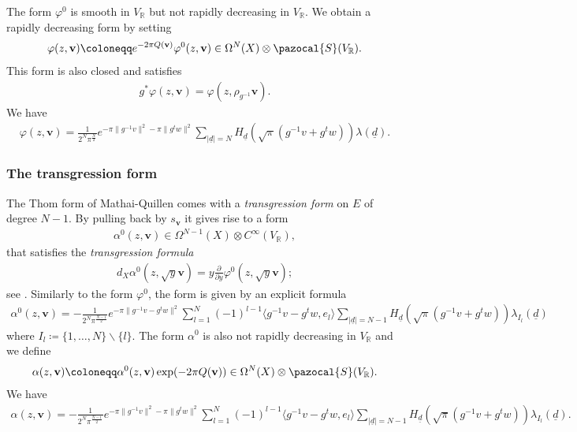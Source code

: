 \documentclass[twoside,a4paper,10pt]{article} %
\newcommand{\uud}{\underline{d}}
\newcommand{\8}{\infty}
\newcommand{\vbf}{\mathbf{v}}
\newcommand{\R}{\mathbb{R}}
\newcommand{\Scal}{\pazocal{S}}
\theoremstyle{mytheoremstyle}
\theoremstyle{remark}
\numberwithin{equation}{section}
\begin{document}
The form $\varphi^0$ is smooth in $V_\R$ but not rapidly decreasing in $V_\R$. We obtain a rapidly decreasing form by setting
\begin{align}
\varphi(z,\vbf) \coloneqq e^{-2\pi Q(\vbf)} \varphi^0(z,\vbf) \in \Omega^N(X) \otimes \Scal(V_\R).
\end{align}
This form is also closed and satisfies
\begin{align} \label{equivariance}
g^\ast \varphi(z,\vbf)=\varphi(z,\rho_{g^{-1}}\vbf).
\end{align}
We have 
\begin{align} \label{expression varphi}
\varphi(z,\vbf)=\frac{1}{2^{N}\pi^{\frac{N}{2}}}e^{-\pi \lVert g^{-1}v \rVert^2-\pi \lVert g^t w \rVert^2} \sum_{\vert \uud \vert=N } H_{\uud}(\sqrt{\pi}(g^{-1}v+g^t w)) \lambda(\uud).
\end{align}











\subsubsection{The transgression form} The Thom form of Mathai-Quillen comes with a {\em transgression form} on $E$ of degree $N-1$. By pulling back by $s_\vbf$ it gives rise to a form 
\begin{align} \alpha^0(z,\vbf) \in \Omega^{N-1}(X) \otimes C^\8(V_\R),
\end{align}
that satisfies the {\em transgression formula}
\begin{align}
d_X\alpha^0(z,\sqrt{y}\vbf)= y \frac{\partial}{\partial y}\varphi^0(z,\sqrt{y}\vbf);
\end{align}
see \cite[Proposition.~3.12]{rbrsln}.
Similarly to the form $\varphi^0$, the form is given by an explicit formula
\begin{align} \label{formalpha}
\alpha^0(z,\vbf) =-\frac{1}{2^{N}\pi^{\frac{N-1}{2}}} e^{ -\pi \lVert g^{-1}v - g^t w \rVert^2}\sum_{l=1}^N (-1)^{l-1} \langle g^{-1}v-g^t w, e_l \rangle  \sum_{\vert \uud \vert=N-1} H_{\uud}(\sqrt{\pi}(g^{-1}v+g^t w)) \lambda_{I_l}(\uud) \qquad
\end{align}
where $I_l \coloneqq \{1, \dots,N\} \smallsetminus \{l\}$. The form $\alpha^0$ is also not rapidly decreasing in $V_\R$ and we define
\begin{align}
\alpha(z,\vbf) \coloneqq \alpha^0(z,\vbf)\exp(-2\pi Q(\vbf)) \in \Omega^N(X) \otimes \Scal(V_\R).
\end{align}
We have 
\begin{align}
\alpha(z,\vbf) =-\frac{1}{2^{N}\pi^{\frac{N-1}{2}}} e^{ -\pi \lVert g^{-1}v \rVert^2-\pi \lVert g^t w \rVert^2} \sum_{l=1}^N (-1)^{l-1}\langle g^{-1}v-g^t w, e_l \rangle \sum_{\vert \uud \vert=N-1} H_{\uud}(\sqrt{\pi}(g^{-1}v+g^t w)) \lambda_{I_l}(\uud).
\end{align}
\end{document}
